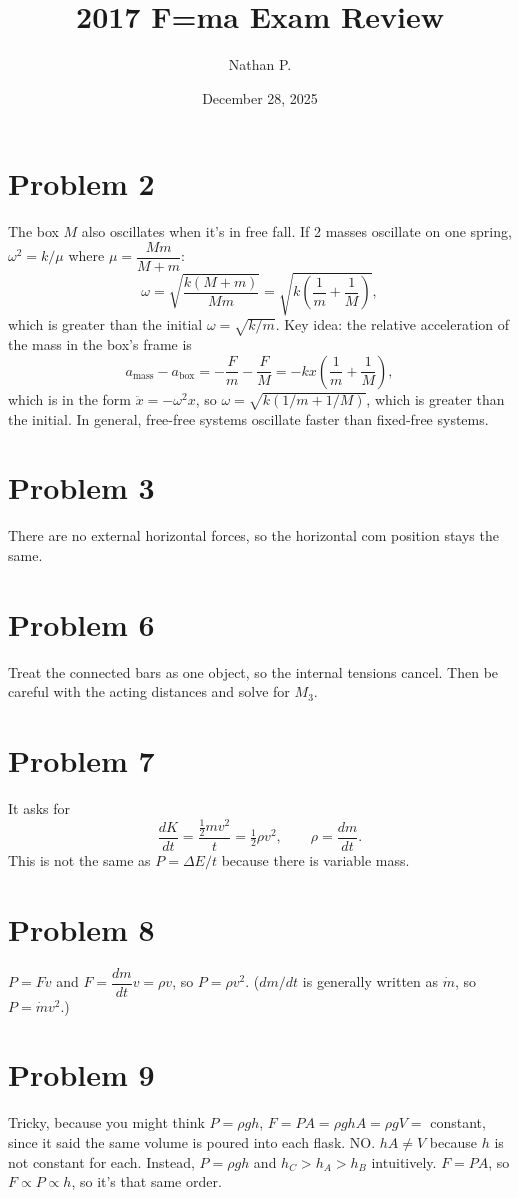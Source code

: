 \documentclass[11pt]{article}
\title{2017 F=ma Exam Review}
\author{Nathan P.}
\date{December 28, 2025}
\begin{document}
\maketitle

\section*{Problem 2}
The box $M$ also oscillates when it's in free fall.
If 2 masses oscillate on one spring, $\omega^2=k/\mu$ where $\mu=\dfrac{Mm}{M+m}$:
\[
\omega=\sqrt{\frac{k(M+m)}{Mm}}=\sqrt{k\left(\frac1m+\frac1M\right)},
\]
which is greater than the initial $\omega=\sqrt{k/m}$.
Key idea: the relative acceleration of the mass in the box's frame is
\[
a_{\text{mass}}-a_{\text{box}}=-\frac Fm-\frac FM=-kx\left(\frac1m+\frac1M\right),
\]
which is in the form $\ddot x=-\omega^2x$, so $\omega=\sqrt{k(1/m+1/M)}$, which is greater than the initial.
In general, free-free systems oscillate faster than fixed-free systems.

\section*{Problem 3}
There are no external horizontal forces, so the horizontal com position stays the same.

\section*{Problem 6}
Treat the connected bars as one object, so the internal tensions cancel. Then be careful with the acting distances and solve for $M_3$.

\section*{Problem 7}
It asks for
\[
\frac{dK}{dt}=\frac{\tfrac12mv^2}{t}=\tfrac12\rho v^2,\qquad \rho=\frac{dm}{dt}.
\]
This is not the same as $P=\Delta E/t$ because there is variable mass.

\section*{Problem 8}
$P=Fv$ and $F=\dfrac{dm}{dt}v=\rho v$, so $P=\rho v^2$. ($dm/dt$ is generally written as $\dot m$, so $P=\dot mv^2$.)

\section*{Problem 9}
Tricky, because you might think $P=\rho gh$, $F=PA=\rho ghA=\rho gV=$ constant, since it said the same volume is poured into each flask. NO. $hA\neq V$ because $h$ is not constant for each.
Instead, $P=\rho gh$ and $h_C>h_A>h_B$ intuitively. $F=PA$, so $F\propto P\propto h$, so it's that same order.
\end{document}
